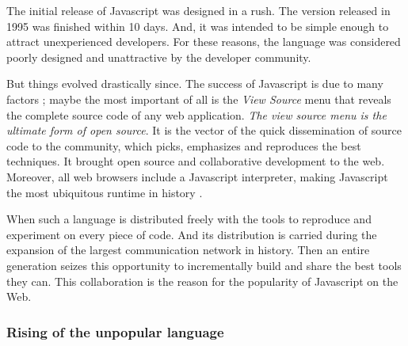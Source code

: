 The initial release of Javascript was designed in a rush. The version released in 1995 was finished within 10 days.
And, it was intended to be simple enough to attract unexperienced developers.
For these reasons, the language was considered poorly designed and unattractive by the developer community.

But things evolved drastically since.
The success of Javascript is due to many factors ; maybe the most important of all is the \textit{View Source} menu that reveals the complete source code of any web application.
\textit{The view source menu is the ultimate form of open source}.
It is the vector of the quick dissemination of source code to the community, which picks, emphasizes and reproduces the best techniques.
It brought open source and collaborative development to the web.
Moreover, all web browsers include a Javascript interpreter, making Javascript the most ubiquitous runtime in history \cite{Flanagan2006}.

When such a language is distributed freely with the tools to reproduce and experiment on every piece of code.
And its distribution is carried during the expansion of the largest communication network in history.
Then an entire generation seizes this opportunity to incrementally build and share the best tools they can.
This collaboration is the reason for the popularity of Javascript on the Web.

\subsubsection{Rising of the unpopular language}

